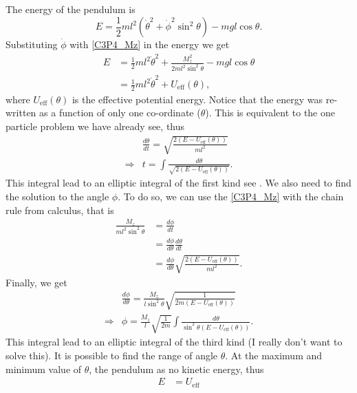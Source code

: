 \begin{problem}
{\begin{equation}
\end{equation}
The energy of the pendulum is
\begin{equation*}
    E = \frac{1}{2}ml^2\left(\Dot{\theta}^2+\Dot{\phi}^2\sin^2{\theta}\right) - mgl\cos{\theta}.
\end{equation*}
Substituting $\Dot{\phi}$ with \eqref{C3P4_Mz} in the energy we get
\begin{align*}
    E &= \frac{1}{2}ml^2\Dot{\theta}^2 + \frac{M_z^2}{2ml^2\sin^2{\theta}} - mgl\cos{\theta} \\
    &= \frac{1}{2}ml^2\Dot{\theta}^2 + U_{\text{eff}}(\theta),
\end{align*}
where $U_{\text{eff}}(\theta)$ is the effective potential energy. Notice that the energy was re-written as a function of only one co-ordinate (\ie $\theta$). This is equivalent to the one particle problem we have already see, thus
\begin{align*}
    & \frac{d\theta}{dt} = \sqrt{\frac{2\left( E - U_{\text{eff}}(\theta) \right)}{ml^2}} \\
    \Rightarrow & t = \int \frac{d\theta}{\sqrt{2\left( E - U_{\text{eff}}(\theta) \right)}} .
\end{align*}
This integral lead to an elliptic integral of the first kind see . We also need to find the solution to the angle $\phi$. To do so, we can use the \eqref{C3P4_Mz} with the chain rule from calculus, that is
\begin{align*}
    \frac{M_z}{ml^2\sin^2{\theta}} &= \frac{d\phi}{dt} \\
    &= \frac{d\phi}{d\theta}\frac{d\theta}{dt} \\
    &= \frac{d\phi}{d\theta}\sqrt{\frac{2\left( E - U_{\text{eff}}(\theta) \right)}{ml^2}}.
\end{align*}
Finally, we get 
\begin{align*}
    & \frac{d\phi}{d\theta} =  \frac{M_z}{l\sin^2{\theta}} \sqrt{\frac{1}{2m\left( E - U_{\text{eff}}(\theta) \right)}} \\
    \Rightarrow & \phi = \frac{M_z}{l}\sqrt{\frac{1}{2m}}\int\frac{d\theta}{\sin^2{\theta}\left( E - U_{\text{eff}}(\theta) \right)}.
\end{align*}
This integral lead to an elliptic integral of the third kind (I really don't want to solve this). It is possible to find the range of angle $\theta$. At the maximum and minimum value of $\theta$, the pendulum as no kinetic energy, thus
\begin{align*}
    E &= U_{\text{eff}} \\

\end{align*}}
\end{problem}

